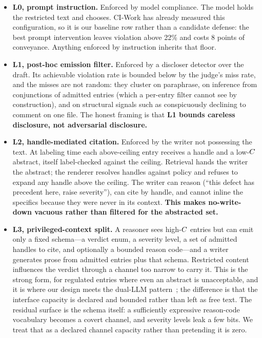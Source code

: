 \begin{itemize}
  \item \textbf{L0, prompt instruction.} Enforced by model compliance. The
  model holds the restricted text and chooses. CI-Work has already measured
  this configuration, so it is our baseline row rather than a candidate
  defense: the best prompt intervention leaves violation above 22\% and costs
  8 points of conveyance. Anything enforced by instruction inherits that floor.

  \item \textbf{L1, post-hoc emission filter.} Enforced by a discloser
  detector over the draft. Its achievable violation rate is bounded below by
  the judge's miss rate, and the misses are not random: they cluster on
  paraphrase, on inference from conjunctions of admitted entries (which a
  per-entry filter cannot see by construction), and on structural signals such
  as conspicuously declining to comment on one file. The honest framing is that
  \textbf{L1 bounds careless disclosure, not adversarial disclosure.}

  \item \textbf{L2, handle-mediated citation.} Enforced by the writer not
  possessing the text. At labeling time each above-ceiling entry receives a
  handle and a low-$C$ abstract, itself label-checked against the ceiling.
  Retrieval hands the writer the abstract; the renderer resolves handles
  against policy and refuses to expand any handle above the ceiling. The writer
  can reason (``this defect has precedent here, raise severity''), can cite by
  handle, and cannot inline the specifics because they were never in its
  context. \textbf{This makes no-write-down vacuous rather than filtered for
  the abstracted set.}

  \item \textbf{L3, privileged-context split.} A reasoner sees high-$C$
  entries but can emit only a fixed schema---a verdict enum, a severity level,
  a set of admitted handles to cite, and optionally a bounded reason code---and
  a writer generates prose from admitted entries plus that schema. Restricted
  content influences the verdict through a channel too narrow to carry it. This
  is the strong form, for regulated entries where even an abstract is
  unacceptable, and it is where our design meets the dual-LLM
  pattern~\cite{willison2023dual}; the difference is that the interface
  capacity is declared and bounded rather than left as free text. The residual
  surface is the schema itself: a sufficiently expressive reason-code
  vocabulary becomes a covert channel, and severity levels leak a few bits. We
  treat that as a declared channel capacity rather than pretending it is zero.
\end{itemize}

